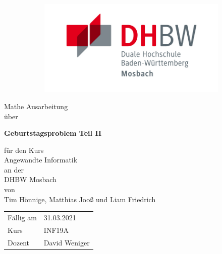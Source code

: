
\begin{titlepage}
    \begin{figure}[!tbp]
\centering
\begin{subfigure}{.5\textwidth}

\end{subfigure}%
\begin{subfigure}{.5\textwidth}
  \centering
  \includegraphics[width=0.9\linewidth]{graphics/dhbw_mosbach.png}
  \label{fig:sub2}
\end{subfigure}
\label{fig:test}
\end{figure}
\begin{center}
\vspace*{1cm}

\LARGE
Mathe Ausarbeitung\\
\vspace{0.8cm}
\normalsize
über

\LARGE
\textbf{Geburtstagsproblem Teil II}\\
\vspace{0.2cm}

\normalsize
\vspace{0.7cm}
für den Kurs\\
\Large
Angewandte Informatik\\
\vspace{0.5cm}
\normalsize
an der \\
\Large
DHBW Mosbach\\

\vspace{0.7cm}
\normalsize
von\\
\Large
Tim Hönnige, Matthias Jooß und Liam Friedrich

\vfill

\vspace{0.8cm}

\begin{table}[h]
\centering
\begin{tabular}{ll}
Fällig am & 31.03.2021\\
Kurs & INF19A \\
Dozent & David Weniger
\end{tabular}
\end{table}

\end{center}
\end{titlepage}
